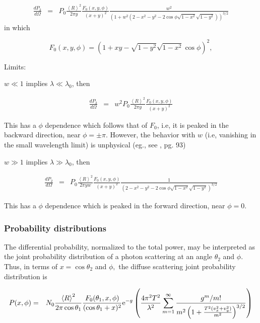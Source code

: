 \documentclass[11pt]{article}
\newcommand{\der}[2]{\frac{d {#1}}{d {#2}}}
\newcommand{\e}{{\rm e}}
\begin{document}
{{{{\begin{eqnarray}
\der{P_{2}}{\Omega}&=&
P_{0}\frac{\left<R\right>^{2}}{2\pi y}\frac{F_{0}(x,y,\phi)}{(x+y)^{2}}\frac{w^{2}}{\left(1+w^{2}\left(2-x^{2}-y^{2}-2\cos\phi\sqrt{1-x^{2}}\sqrt{1-y^{2}}\right)\right)^{3/2}}
\end{eqnarray}
in which

$$F_{0}(x,y,\phi)=\left(1+xy-\sqrt{1-y^{2}}\sqrt{1-x^{2}}\cos\phi\right)^{2},$$

Limits: 

$w\ll1$ implies $\lambda \ll \lambda_{0}$, then

\begin{eqnarray}
\der{P_{2}}{\Omega}&=&w^{2}
P_{0}\frac{\left<R\right>^{2}}{2\pi y}\frac{F_{0}(x,y,\phi)}{(x+y)^{2}}\end{eqnarray}

This has a $\phi$ dependence which follows that of $F_{0}$, i.e, it is peaked in the backward direction, near $\phi=\pm\pi$. However, the behavior with $w$ (i.e, vanishing in the small wavelength limit) is unphysical (eg., see \cite{b:ogilvy}, pg. 93)

$w\gg1$ implies $\lambda \gg \lambda_{0}$, then

\begin{eqnarray}
\der{P_{2}}{\Omega}&=&
P_{0}\frac{\left<R\right>^{2}}{2\pi y w}\frac{F_{0}(x,y,\phi)}{(x+y)^{2}}\frac{1}{\left(2-x^{2}-y^{2}-2\cos\phi\sqrt{1-x^{2}}\sqrt{1-y^{2}}\right)^{3/2}}\end{eqnarray}


This has a $\phi$ dependence which is peaked in the forward direction, near $\phi=0$.

\subsubsection{Probability distributions}

The differential probability, normalized to the total power, may be interpreted as the joint probability distribution of a photon scattering at an angle $\theta_{2}$ and $\phi$.  Thus, in terms of $x=\cos\theta_{2}$ and $\phi,$ the diffuse scattering joint probability distribution is

\begin{eqnarray}
P(x,\phi)&=&N_{0}\frac{\left<R\right>^{2}}{2\pi\cos\theta_{1}}\frac{F_{0}(\theta_{1},x,\phi)}{(\cos{\theta_{1}}+x)^{2}}
\e^{-g}\left(\frac{4\pi^{2}T^{2}}{\lambda^{2}}\sum_{m=1}^{\infty}\frac{g^{m}/m!}{m^{2}\left(1+\frac{T^{2}(v_{x}^{2}+v_{y}^{2})}{m^{2}}\right)^{3/2}}\right)\end{eqnarray}

}}}}
\end{document}

